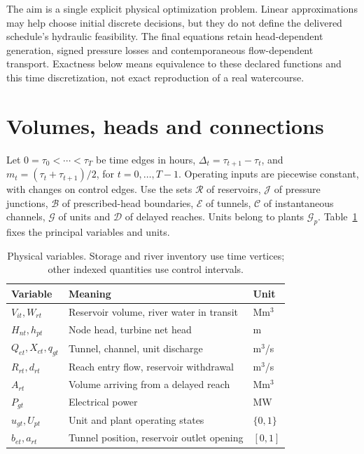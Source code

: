 \documentclass[10pt,a4paper]{article}
\begin{document}
The aim is a single explicit physical optimization problem. Linear
approximations may help choose initial discrete decisions, but they do not
define the delivered schedule's hydraulic feasibility. The final equations
retain head-dependent generation, signed pressure losses and contemporaneous
flow-dependent transport. Exactness below means equivalence to these
declared functions and this time discretization, not exact reproduction of
a real watercourse.

\section{Volumes, heads and connections}
\label{sec:water}

Let $0=\tau_0<\cdots<\tau_T$ be time edges in hours,
$\Delta_t=\tau_{t+1}-\tau_t$, and
$m_t=(\tau_t+\tau_{t+1})/2$, for $t=0,\ldots,T-1$.
Operating inputs are piecewise constant, with changes on control edges.
Use the sets $\mathcal R$ of reservoirs, $\mathcal J$ of pressure junctions,
$\mathcal B$ of prescribed-head boundaries, $\mathcal E$ of tunnels,
$\mathcal C$ of instantaneous channels, $\mathcal G$ of units and
$\mathcal D$ of delayed reaches. Units belong to plants $\mathcal G_p$.
Table~\ref{tab:variables} fixes the principal variables and units.

\begin{table}[ht]
\centering
\caption{Physical variables. Storage and river inventory use time vertices;
other indexed quantities use control intervals.}
\label{tab:variables}
\begin{tabular}{lll}
\toprule
Variable & Meaning & Unit\\
\midrule
$V_{it},W_{rt}$ & Reservoir volume, river water in transit & Mm$^3$\\
$H_{nt},h_{pt}$ & Node head, turbine net head & m\\
$Q_{et},X_{ct},q_{gt}$ & Tunnel, channel, unit discharge & m$^3$/s\\
$R_{rt},d_{rt}$ & Reach entry flow, reservoir withdrawal & m$^3$/s\\
$A_{rt}$ & Volume arriving from a delayed reach & Mm$^3$\\
$P_{gt}$ & Electrical power & MW\\
$u_{gt},U_{pt}$ & Unit and plant operating states & $\{0,1\}$\\
$b_{et},a_{rt}$ & Tunnel position, reservoir outlet opening & $[0,1]$\\
\bottomrule
\end{tabular}
\end{table}
\end{document}

